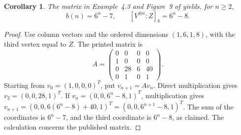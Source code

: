 \documentclass[11pt]{article}
\newtheorem{corollary}[theorem]{Corollary}
\begin{document}
\begin{corollary}\label{cor:fusion}
The matrix in Example~4.3 and Figure~9 of \cite[p.~17]{HT25} yields, for \(n\geq2\),
\[
 b(n)=6^n-7,\qquad [V^{\otimes n}:Z]_b=6^n-8.
\]
\end{corollary}
\begin{proof}
Use column vectors and the ordered
dimensions \((1,6,1,8)\), with the third vertex equal to \(Z\). The printed
matrix is
\[
 A=\begin{pmatrix}0&0&0&0\\1&0&0&0\\0&28&6&40\\0&1&0&1\end{pmatrix}.
\]
Starting from \(v_0=(1,0,0,0)^T\), put \(v_{n+1}=Av_n\). Direct multiplication
gives \(v_2=(0,0,28,1)^T\). If
\(v_n=(0,0,6^n-8,1)^T\), multiplication gives
\(v_{n+1}=(0,0,6(6^n-8)+40,1)^T=(0,0,6^{n+1}-8,1)^T\).
The sum of the coordinates is \(6^n-7\), and the third coordinate is
\(6^n-8\), as claimed. The calculation concerns the published matrix.
\end{proof}
\end{document}

